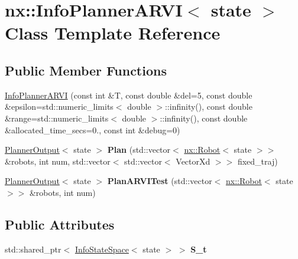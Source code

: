 \hypertarget{classnx_1_1InfoPlannerARVI}{}\section{nx\+:\+:Info\+Planner\+A\+R\+VI$<$ state $>$ Class Template Reference}
\label{classnx_1_1InfoPlannerARVI}
\subsection*{Public Member Functions}
\begin{DoxyCompactItemize}
\item 
\hyperlink{classnx_1_1InfoPlannerARVI_abb908254580047ad273b6f9b9a8caf24}{Info\+Planner\+A\+R\+VI} (const int \&T, const double \&del=5, const double \&epsilon=std\+::numeric\+\_\+limits$<$ double $>$\+::infinity(), const double \&range=std\+::numeric\+\_\+limits$<$ double $>$\+::infinity(), const double \&allocated\+\_\+time\+\_\+secs=0., const int \&debug=0)
\item 
\mbox{\label{classnx_1_1InfoPlannerARVI_a77fdbe59f157d0fef34118ad4655470e}} 
\hyperlink{structnx_1_1PlannerOutput}{Planner\+Output}$<$ state $>$ {\bfseries Plan} (std\+::vector$<$ \hyperlink{classnx_1_1Robot}{nx\+::\+Robot}$<$ state $>$$>$ \&robots, int num, std\+::vector$<$ std\+::vector$<$ Vector\+Xd $>$$>$ fixed\+\_\+traj)
\item 
\mbox{\label{classnx_1_1InfoPlannerARVI_a697b6b64459863124c7ef3f7daba7dc3}} 
\hyperlink{structnx_1_1PlannerOutput}{Planner\+Output}$<$ state $>$ {\bfseries PlanARVI\+Test} (std\+::vector$<$ \hyperlink{classnx_1_1Robot}{nx\+::\+Robot}$<$ state $>$$>$ \&robots, int num)
\end{DoxyCompactItemize}
\subsection*{Public Attributes}
\begin{DoxyCompactItemize}
\item 
\mbox{\label{classnx_1_1InfoPlannerARVI_a471fe0c7b071380a34b309595441e1b6}} 
std\+::shared\+\_\+ptr$<$ \hyperlink{structnx_1_1InfoStateSpace}{Info\+State\+Space}$<$ state $>$ $>$ {\bfseries S\+\_\+t}
\end{DoxyCompactItemize}


